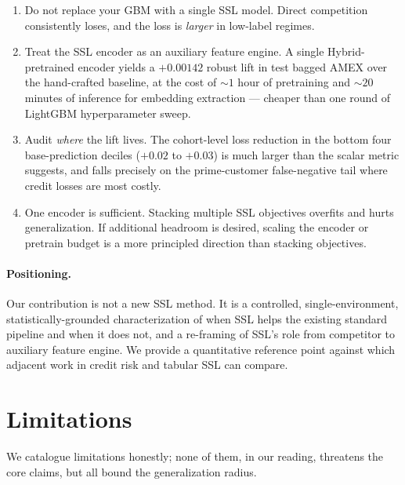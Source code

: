 \documentclass[sigconf, anonymous, review]{acmart}
\begin{document}
\begin{enumerate}
  \item Do not replace your GBM with a single SSL model.
        Direct competition consistently loses, and the loss is
        \emph{larger} in low-label regimes.
  \item Treat the SSL encoder as an auxiliary feature engine.
        A single Hybrid-pretrained encoder yields a $+0.00142$
        robust lift in test bagged AMEX over the hand-crafted
        baseline, at the cost of $\sim 1$ hour of pretraining and
        $\sim 20$ minutes of inference for embedding extraction ---
        cheaper than one round of LightGBM hyperparameter sweep.
  \item Audit \emph{where} the lift lives. The cohort-level loss
        reduction in the bottom four base-prediction deciles
        ($+0.02$ to $+0.03$) is much larger than the scalar metric
        suggests, and falls precisely on the prime-customer
        false-negative tail where credit losses are most costly.
  \item One encoder is sufficient. Stacking multiple SSL objectives
        overfits and hurts generalization. If additional headroom is
        desired, scaling the encoder or pretrain budget is a more
        principled direction than stacking objectives.
\end{enumerate}

\paragraph{Positioning.}
Our contribution is not a new SSL method. It is a controlled,
single-environment, statistically-grounded characterization of when
SSL helps the existing standard pipeline and when it does not, and
a re-framing of SSL's role from competitor to auxiliary feature
engine. We provide a quantitative reference point against which
adjacent work in credit risk and tabular SSL can compare.

\section{Limitations}
\label{sec:limitations}

We catalogue limitations honestly; none of them, in our reading,
threatens the core claims, but all bound the generalization radius.
\end{document}

